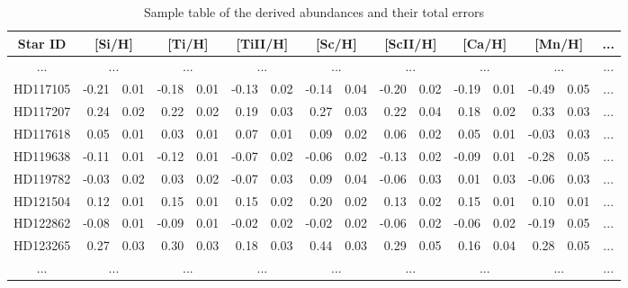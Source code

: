 \documentclass[dvips,12pt,a4paper]{report}
\begin{document}
{{%
\begin{table}[h]\scriptsize
\centering
\caption[Sample table of the abundance derived for the species]{Sample table of the derived abundances and their total errors}
  \label{abundance_table}
  \begin{tabular}{ c r@{$\pm$}l r@{$\pm$}l r@{$\pm$}l r@{$\pm$}l r@{$\pm$}l r@{$\pm$}l r@{$\pm$}l c}
  \hline
  \hline
Star ID & \multicolumn {2}{c}{[Si/H]} & \multicolumn {2}{c}{[Ti/H]} & \multicolumn {2}{c}{[TiII/H]} & \multicolumn {2}{c}{[Sc/H]} & \multicolumn {2}{c}{[ScII/H]} & \multicolumn {2}{c}{[Ca/H]} & \multicolumn {2}{c}{[Mn/H]} & ... \\
\hline
... & \multicolumn {2}{c}{...} & \multicolumn {2}{c}{...} & \multicolumn {2}{c}{...} & \multicolumn {2}{c}{...} & \multicolumn {2}{c}{...} & \multicolumn {2}{c}{...} & \multicolumn {2}{c}{...} & ... \\
HD117105 & -0.21 & 0.01 & -0.18 & 0.01 & -0.13 & 0.02 & -0.14 & 0.04 & -0.20 & 0.02 & -0.19 & 0.01 & -0.49 & 0.05 & ...\\
HD117207 &  0.24 & 0.02 &  0.22 & 0.02 &  0.19 & 0.03 &  0.27 & 0.03 &  0.22 & 0.04 &  0.18 & 0.02 &  0.33 & 0.03 & ...\\
HD117618 &  0.05 & 0.01 &  0.03 & 0.01 &  0.07 & 0.01 &  0.09 & 0.02 &  0.06 & 0.02 &  0.05 & 0.01 & -0.03 & 0.03 & ...\\
HD119638 & -0.11 & 0.01 & -0.12 & 0.01 & -0.07 & 0.02 & -0.06 & 0.02 & -0.13 & 0.02 & -0.09 & 0.01 & -0.28 & 0.05 & ...\\
HD119782 & -0.03 & 0.02 &  0.03 & 0.02 & -0.07 & 0.03 &  0.09 & 0.04 & -0.06 & 0.03 &  0.01 & 0.03 & -0.06 & 0.03 & ...\\
HD121504 &  0.12 & 0.01 &  0.15 & 0.01 &  0.15 & 0.02 &  0.20 & 0.02 &  0.13 & 0.02 &  0.15 & 0.01 &  0.10 & 0.01 & ...\\
HD122862 & -0.08 & 0.01 & -0.09 & 0.01 & -0.02 & 0.02 & -0.02 & 0.02 & -0.06 & 0.02 & -0.06 & 0.02 & -0.19 & 0.05 & ...\\
HD123265 &  0.27 & 0.03 &  0.30 & 0.03 &  0.18 & 0.03 &  0.44 & 0.03 &  0.29 & 0.05 &  0.16 & 0.04 &  0.28 & 0.05 & ...\\
... & \multicolumn {2}{c}{...} & \multicolumn {2}{c}{...} & \multicolumn {2}{c}{...} & \multicolumn {2}{c}{...} & \multicolumn {2}{c}{...} & \multicolumn {2}{c}{...} & \multicolumn {2}{c}{...}  & ... \\
\hline
\end{tabular}
\end{table}

}}
\end{document}
